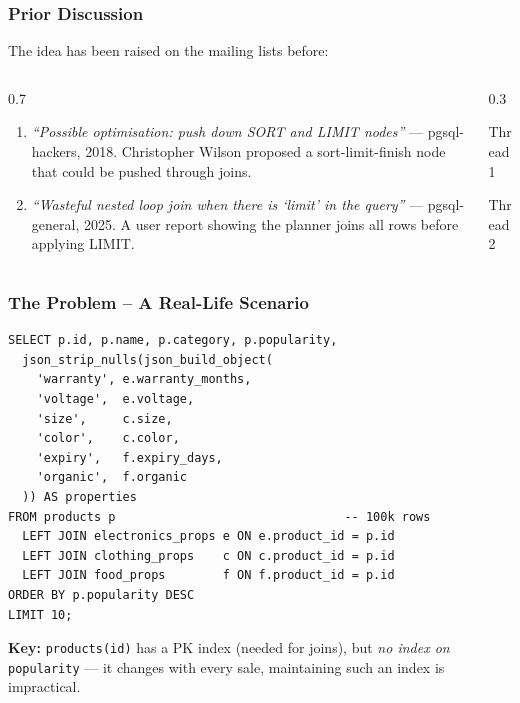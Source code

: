 \documentclass{beamer}
\begin{document}
\begin{frame}\frametitle{Prior Discussion}
The idea has been raised on the mailing lists before:
\bigskip
\begin{columns}[T]\begin{column}{0.7\textwidth}
\begin{enumerate}
  \item \textit{``Possible optimisation: push down SORT and LIMIT nodes''} --- pgsql-hackers, 2018.
  Christopher Wilson proposed a sort-limit-finish node that could be pushed through joins.
  \medskip
  \item \textit{``Wasteful nested loop join when there is `limit' in the query''} --- pgsql-general, 2025.
  A user report showing the planner joins all rows before applying LIMIT.
\end{enumerate}
\end{column}\begin{column}{0.3\textwidth}
\begin{center}
\vspace{3mm}
{\tiny Thread 1}
\vspace{5mm}

\vspace{3mm}
{\tiny Thread 2}
\end{center}
\end{column}\end{columns}
\end{frame}


\begin{frame}[fragile]\frametitle{The Problem -- A Real-Life Scenario}
\begin{lstlisting}
SELECT p.id, p.name, p.category, p.popularity,
  json_strip_nulls(json_build_object(
    'warranty', e.warranty_months,
    'voltage',  e.voltage,
    'size',     c.size,
    'color',    c.color,
    'expiry',   f.expiry_days,
    'organic',  f.organic
  )) AS properties
FROM products p                                -- 100k rows
  LEFT JOIN electronics_props e ON e.product_id = p.id
  LEFT JOIN clothing_props    c ON c.product_id = p.id
  LEFT JOIN food_props        f ON f.product_id = p.id
ORDER BY p.popularity DESC
LIMIT 10;
\end{lstlisting}
\medskip
\textbf{Key:} \texttt{products(id)} has a PK index (needed for joins), but
\textit{no index on} \texttt{popularity} --- it changes with every sale,
maintaining such an index is impractical.
\end{frame}
\end{document}
